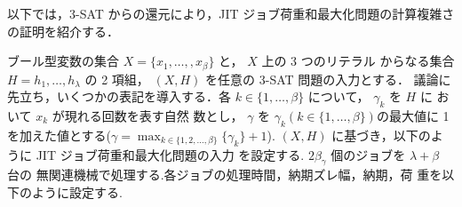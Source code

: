 \documentclass[12pt]{optlab-bachelor}
\begin{document}
以下では，\textsc{3-SAT} からの還元により，JIT ジョブ荷重和最大化問題の計算複雑さの証明を紹介する．

ブール型変数の集合 $X = \{x_1,\ldots,,x_β\}$ と， $X$ 上の 3 つのリテラル
からなる集合 $H = {h_1,\ldots,h_{\lambda}}$ の 2 項組， $(X,H)$ を任意の
\textsc{3-SAT} 問題の入力とする．
議論に先立ち，いくつかの表記を導入する．各 $k \in \{1,\ldots,\beta\}$
について， $\gamma_k$ を $H$ に おいて $x_k$ が現れる回数を表す自然
数とし， $\gamma$ を $\gamma_k ( k \in \{1,\ldots,\beta\} )$の最大値に
1 を加えた値とする($\displaystyle \gamma = \max_{k \in \{1,2,\ldots, \beta\}} \{\gamma_k \}+ 1$).
$(X, H)$ に基づき，以下のように JIT ジョブ荷重和最大化問題の入力
を設定する. $2\beta_{\gamma}$ 個のジョブを $\lambda + \beta$ 台の
無関連機械で処理する.各ジョブの処理時間，納期ズレ幅，納期，荷
重を以下のように設定する.
\end{document}
